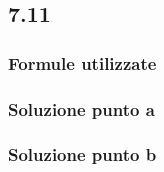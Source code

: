 \documentclass[../../main.tex]{subfiles}
\begin{document}
\subsection*{7.11}
\subsubsection*{Formule utilizzate}
\subsubsection*{Soluzione punto a}
\subsubsection*{Soluzione punto b}
\newpage
\end{document}
